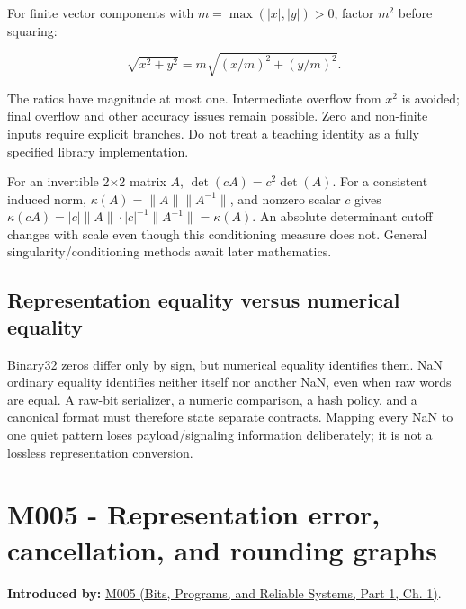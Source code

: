 \hypertarget{03-visual-computing-i-ch018-scaling-a-norm-and-a-determinant}{}

For finite vector components with \(m=\max(|x|,|y|)>0\), factor \(m^2\) before squaring:

\[
\sqrt{x^2+y^2}=m\sqrt{(x/m)^2+(y/m)^2}.
\]

The ratios have magnitude at most one. Intermediate overflow from \(x^2\) is avoided; final overflow and other accuracy issues remain possible. Zero and non-finite inputs require explicit branches. Do not treat a teaching identity as a fully specified library implementation.

For an invertible 2×2 matrix \(A\), \(\det(cA)=c^2\det(A)\). For a consistent induced norm, \(\kappa(A)=\|A\|\|A^{-1}\|\), and nonzero scalar \(c\) gives \(\kappa(cA)=|c|\|A\|\cdot|c|^{-1}\|A^{-1}\|=\kappa(A)\). An absolute determinant cutoff changes with scale even though this conditioning measure does not. General singularity/conditioning methods await later mathematics.

\subsection{Representation equality versus numerical equality}\label{03-visual-computing-i-ch018-representation-equality-versus-numerical-equality}

\hypertarget{03-visual-computing-i-ch018-representation-equality-versus-numerical-equality}{}

Binary32 zeros differ only by sign, but numerical equality identifies them. NaN ordinary equality identifies neither itself nor another NaN, even when raw words are equal. A raw-bit serializer, a numeric comparison, a hash policy, and a canonical format must therefore state separate contracts. Mapping every NaN to one quiet pattern loses payload/signaling information deliberately; it is not a lossless representation conversion.

\section{M005 - Representation error, cancellation, and rounding graphs}\label{03-visual-computing-i-ch018-m005---representation-error-cancellation-and-rounding-graphs}

\hypertarget{03-visual-computing-i-ch018-m005---representation-error-cancellation-and-rounding-graphs}{}

\textbf{Introduced by:} \href{../01-Bits-Programs-and-Reliable-Systems-P01/main.pdf\#01-foundations-i-ch001-when-arithmetic-meets-uncertainty}{M005 (Bits, Programs, and Reliable Systems, Part 1, Ch. 1)}.

